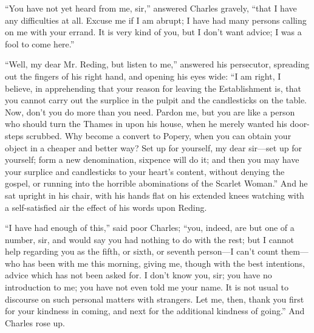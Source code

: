 ``You have not yet heard from me, sir,'' answered Charles
gravely, ``that I have any difficulties at all. Excuse me if I am
abrupt; I have had many persons calling on me with your errand. It is
very kind of you, but I don't want advice; I was a fool to come
here.''

``Well, my dear Mr. Reding, but listen to me,'' answered his persecutor, spreading out the fingers of his right hand,
and opening his eyes wide: ``I am right, I believe, in
apprehending that your reason for leaving the Establishment is, that
you cannot carry out the surplice in the pulpit and the candlesticks
on the table. Now, don't you do more than you need. Pardon me, but you
are like a person who should turn the Thames in upon his house, when
he merely wanted his door-steps scrubbed. Why become a convert to
Popery, when you can obtain your object in a cheaper and better way?
Set up for yourself, my dear sir—set up for yourself; form a new
denomination, sixpence will do it; and then you may have your surplice
and candlesticks to your heart's content, without denying the gospel,
or running into the horrible abominations of the Scarlet Woman.''
And he sat upright in his chair, with his hands flat on his extended
knees watching with a self-satisfied air the effect of his words upon
Reding.

``I have had enough of this,'' said poor Charles;
``you, indeed, are but one of a number, sir, and would say you had
nothing to do with the rest; but I cannot help regarding you as the
fifth, or sixth, or seventh person—I can't count them—who has been
with me this morning, giving me, though with the best intentions,
advice which has not been asked for. I don't know you, sir; you have
no introduction to me; you have not even told me your name. It is not
usual to discourse on such personal matters with strangers. Let me,
then, thank you first for your kindness in coming, and next for the
additional kindness of going.'' And Charles rose up.

